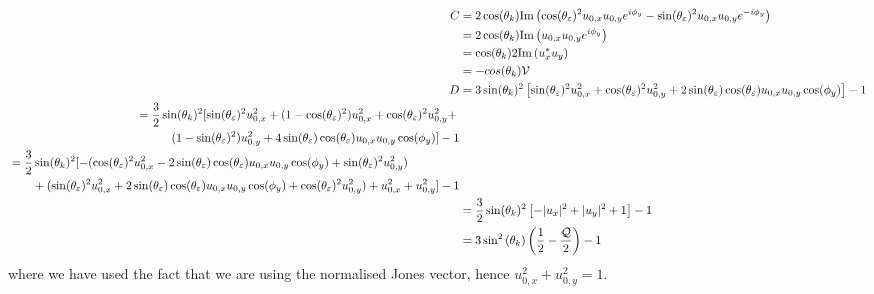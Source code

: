 	\begin{align}
	    C&=2\cos(\theta_k)\text{Im}\left(\cos(\theta_\varepsilon)^2 u_{0,x} u_{0,y} e^{i \phi_y} -\sin(\theta_\varepsilon)^2 u_{0,x} u_{0,y} e^{-i \phi_y}\right)\\
	    &= 2\cos(\theta_k)\text{Im}\left(u_{0,x} u_{0,y} e^{i \phi_y}\right)\\
	    &= \cos(\theta_k)2\text{Im}\left(u_x^* u_y\right)\\
	    &= -cos(\theta_k) \mathcal{V}\\
	    D&=3\sin(\theta_k)^2 \left[\sin(\theta_\varepsilon)^2 u_{0,x}^2 +\cos(\theta_\varepsilon)^2 u_{0,y}^2 + 2\sin(\theta_\varepsilon)\cos(\theta_\varepsilon)u_{0,x}u_{0,y} \cos(\phi_y)\right] -1\\
	    \begin{split}&=\frac{3}{2}\sin(\theta_k)^2 \large[\sin(\theta_\varepsilon)^2 u_{0,x}^2 + (1-\cos(\theta_\varepsilon)^2) u_{0,x}^2 +\cos(\theta_\varepsilon)^2 u_{0,y}^2+\\&\quad\quad\quad(1-\sin(\theta_\varepsilon)^2) u_{0,y}^2 + 4\sin(\theta_\varepsilon)\cos(\theta_\varepsilon)u_{0,x}u_{0,y} \cos(\phi_y)\large]-1\end{split}\\
	    \begin{split}&= \frac{3}{2}\sin(\theta_k)^2 \large[-(\cos(\theta_\varepsilon)^2 u_{0,x}^2-2\sin(\theta_\varepsilon)\cos(\theta_\varepsilon)u_{0,x}u_{0,y} \cos(\phi_y)+ \sin(\theta_\varepsilon)^2 u_{0,y}^2) \\&\quad \quad + (\sin(\theta_\varepsilon)^2 u_{0,x}^2 + 2\sin(\theta_\varepsilon)\cos(\theta_\varepsilon)u_{0,x}u_{0,y} \cos(\phi_y) + \cos(\theta_\varepsilon)^2 u_{0,y}^2) + u_{0,x}^2 + u_{0,y}^2 \large]-1\end{split}\\
	    &=\frac{3}{2}\sin(\theta_k)^2 \left[-|u_x|^2 + |u_y|^2 + 1 \right] - 1\\
	    &=3 \sin^2\left( \theta_k \right) \left(\frac{1}{2} -  \frac{\mathcal{Q}}{2}\right) -1 
	\end{align}
	where we have used the fact that we are using the normalised Jones vector, hence \(u_{0,x}^2 + u_{0,y}^2 = 1\). 


